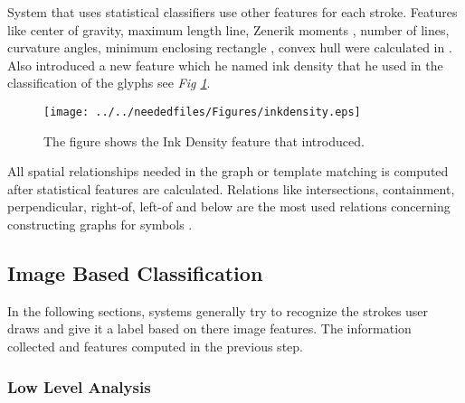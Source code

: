  System that uses statistical classifiers use other features for each stroke. Features like center of gravity\cite{gestureexample12,sketchunderstanding1}, maximum length line, Zenerik moments \cite{zernike61}, number of lines, curvature angles, minimum enclosing rectangle\cite {incrmentintention41} , convex hull were calculated in \cite {Cali63}.  Also \cite {geometrydomain49} introduced a new feature which he named ink density that he used in the classification of the glyphs see \textit{Fig \ref{fig:inkdensity}}. 
\begin{figure}
	\centering
		\texttt{[image: ../../neededfiles/Figures/inkdensity.eps]}
	\caption[Statistical Feature Example]{The figure shows the Ink Density feature that \cite{geometrydomain49} introduced. }
	\label{fig:inkdensity}
\end{figure}
All spatial relationships needed in the graph or template matching is computed after statistical features are calculated. Relations like intersections, containment, perpendicular, right-of, left-of and below are the most used relations concerning constructing graphs for symbols\cite {geometrydomain49,sketchinginterfaces2} .%


\subsection{Image Based Classification}
\label{sec:Image Based Classification}

In the following sections, systems generally try to recognize the strokes user draws and give it a label based on there image features. The information collected and features computed in the previous step.
 \subsubsection{Low Level Analysis}
\label{sec:Low Level Analysis}

%
	





%

